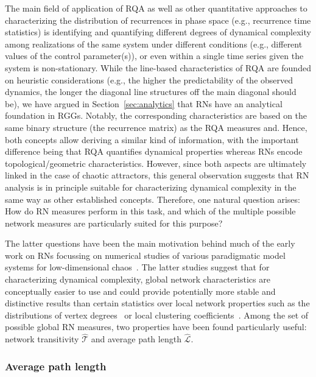 \documentclass[graybox]{svmult}
\begin{document}
The main field of application of RQA as well as other quantitative approaches to characterizing the distribution of recurrences in phase space (e.g., recurrence time statistics) is identifying and quantifying different degrees of dynamical complexity among realizations of the same system under different conditions (e.g., different values of the control parameter(s)), or even within a single time series given the system is non-stationary. While the line-based characteristics of RQA are founded on heuristic considerations (e.g., the higher the predictability of the observed dynamics, the longer the diagonal line structures off the main diagonal should be), we have argued in Section~\ref{sec:analytics} that RNs have an analytical foundation in RGGs. Notably, the corresponding characteristics are based on the same binary structure (the recurrence matrix) as the RQA measures and. Hence, both concepts allow deriving a similar kind of information, with the important difference being that RQA quantifies dynamical properties whereas RNs encode topological/geometric characteristics. However, since both aspects are ultimately linked in the case of chaotic attractors, this general observation suggests that RN analysis is in principle suitable for characterizing dynamical complexity in the same way as other established concepts. Therefore, one natural question arises: How do RN measures perform in this task, and which of the multiple possible network measures are particularly suited for this purpose?

The latter questions have been the main motivation behind much of the early work on RNs focussing on numerical studies of various paradigmatic model systems for low-dimensional chaos~\cite{Donner2010Nolta,Donner2011IJBC,Donner2010PRE,Donner2010NJP,Marwan2009,Zou2010,Zou2012aChaos}. The latter studies suggest that for characterizing dynamical complexity, global network characteristics are conceptually easier to use and could provide potentially more stable and distinctive results than certain statistics over local network properties such as the distributions of vertex degrees~\cite{Zou2012EPL} or local clustering coefficients~\cite{Zou2012aChaos}. Among the set of possible global RN measures, two properties have been found particularly useful: network transitivity $\hat{\mathcal{T}}$ and average path length $\hat{\mathcal{L}}$.


\subsubsection{Average path length}\label{sec:apl}
\end{document}
